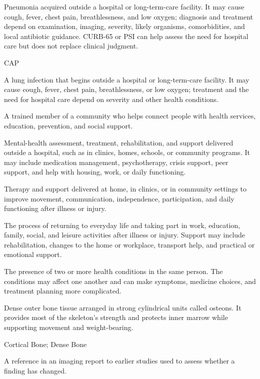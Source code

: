  Pneumonia acquired outside a hospital or long-term-care facility. It may cause cough, fever, chest pain, breathlessness, and low oxygen; diagnosis and treatment depend on examination, imaging, severity, likely organisms, comorbidities, and local antibiotic guidance. CURB-65 or PSI can help assess the need for hospital care but does not replace clinical judgment.

\synonyms
CAP

 A lung infection that begins outside a hospital or long-term-care facility. It may cause cough, fever, chest pain, breathlessness, or low oxygen; treatment and the need for hospital care depend on severity and other health conditions.

 A trained member of a community who helps connect people with health services, education, prevention, and social support.

 Mental-health assessment, treatment, rehabilitation, and support delivered outside a hospital, such as in clinics, homes, schools, or community programs. It may include medication management, psychotherapy, crisis support, peer support, and help with housing, work, or daily functioning.

 Therapy and support delivered at home, in clinics, or in community settings to improve movement, communication, independence, participation, and daily functioning after illness or injury.

 The process of returning to everyday life and taking part in work, education, family, social, and leisure activities after illness or injury. Support may include rehabilitation, changes to the home or workplace, transport help, and practical or emotional support.

 The presence of two or more health conditions in the same person. The conditions may affect one another and can make symptoms, medicine choices, and treatment planning more complicated.

 Dense outer bone tissue arranged in strong cylindrical units called osteons. It provides most of the skeleton’s strength and protects inner marrow while supporting movement and weight-bearing.

\synonyms
Cortical Bone; Dense Bone

 A reference in an imaging report to earlier studies used to assess whether a finding has changed.

